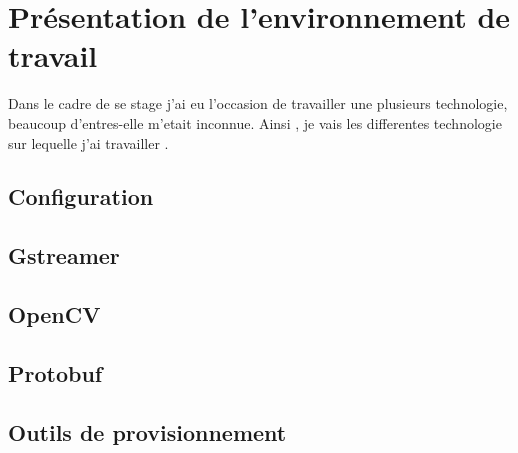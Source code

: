 \section{Présentation de l'environnement de travail}
Dans le cadre de se stage j'ai eu l'occasion de travailler une plusieurs technologie, beaucoup d'entres-elle m'etait inconnue.
Ainsi , je vais les differentes technologie sur lequelle j'ai travailler .
\subsection{Configuration}
\subsection{Gstreamer}
\subsection{OpenCV}
\subsection{Protobuf}
\subsection{Outils de provisionnement}
